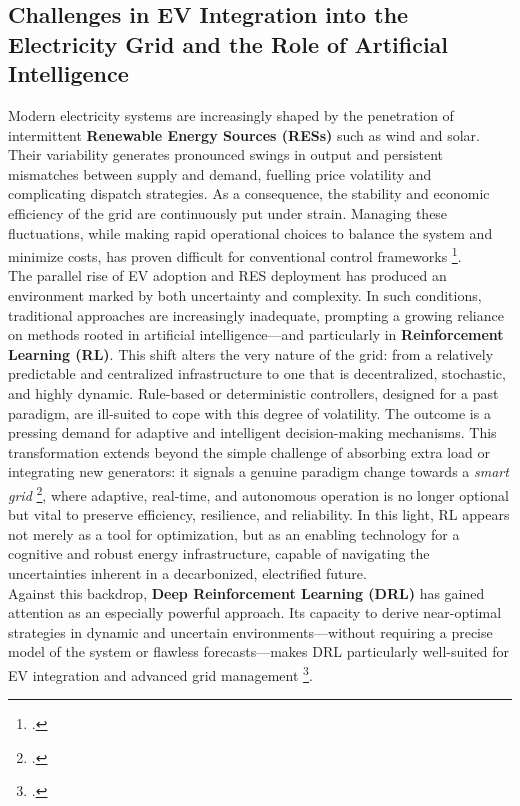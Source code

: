 \subsection{Challenges in EV Integration into the Electricity Grid and the Role of Artificial Intelligence} %
Modern electricity systems are increasingly shaped by the penetration of intermittent \textbf{Renewable Energy Sources (RESs)} such as wind and solar. 
Their variability generates pronounced swings in output and persistent mismatches between supply and demand, fuelling price volatility and complicating dispatch strategies. 
As a consequence, the stability and economic efficiency of the grid are continuously put under strain. 
Managing these fluctuations, while making rapid operational choices to balance the system and minimize costs, has proven difficult for conventional control frameworks \footcite{orfanoudakis2022deep, minchala2025systematic}. 
\\
\noindent
The parallel rise of EV adoption and RES deployment has produced an environment marked by both uncertainty and complexity. 
In such conditions, traditional approaches are increasingly inadequate, prompting a growing reliance on methods rooted in artificial intelligence—and particularly in \textbf{Reinforcement Learning (RL)}. 
This shift alters the very nature of the grid: from a relatively predictable and centralized infrastructure to one that is decentralized, stochastic, and highly dynamic. 
Rule-based or deterministic controllers, designed for a past paradigm, are ill-suited to cope with this degree of volatility. 
The outcome is a pressing demand for adaptive and intelligent decision-making mechanisms. 
This transformation extends beyond the simple challenge of absorbing extra load or integrating new generators: it signals a genuine paradigm change towards a \emph{smart grid} \footcite{alhmoud2024review}, where adaptive, real-time, and autonomous operation is no longer optional but vital to preserve efficiency, resilience, and reliability. 
In this light, RL appears not merely as a tool for optimization, but as an enabling technology for a cognitive and robust energy infrastructure, capable of navigating the uncertainties inherent in a decarbonized, electrified future.
\\
\noindent
Against this backdrop, \textbf{Deep Reinforcement Learning (DRL)} has gained attention as an especially powerful approach. 
Its capacity to derive near-optimal strategies in dynamic and uncertain environments—without requiring a precise model of the system or flawless forecasts—makes DRL particularly well-suited for EV integration and advanced grid management \footcite{orfanoudakis2022deep, shibl2023electric}.


